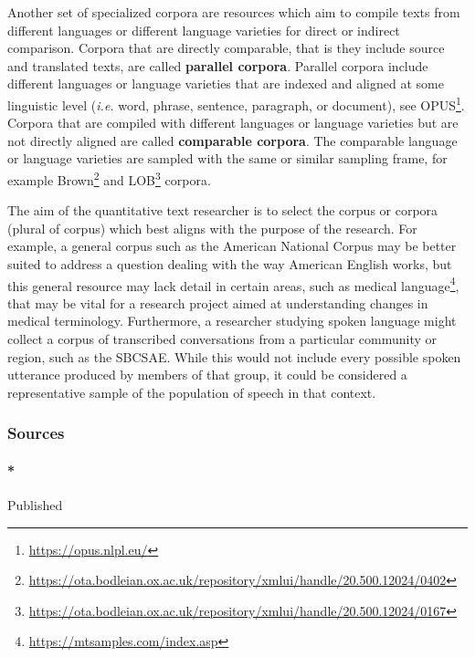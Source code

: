 \documentclass[
  letterpaper,
]{latex/krantz}
\let\oldparagraph\paragraph
\renewcommand{\paragraph}[1]{\oldparagraph{#1}\mbox{}}
\DeclareRobustCommand{\href}[2]{#2\footnote{\url{#1}}}
\begin{document}
Another set of specialized corpora are resources which aim to compile
texts from different languages or different language varieties for
direct or indirect comparison. Corpora that are directly comparable,
that is they include source and translated texts, are called
\textbf{parallel corpora}. Parallel corpora include different languages
or language varieties that are indexed and aligned at some linguistic
level (\emph{i.e.} word, phrase, sentence, paragraph, or document), see
\href{https://opus.nlpl.eu/}{OPUS}. Corpora that are compiled with
different languages or language varieties but are not directly aligned
are called \textbf{comparable corpora}. The comparable language or
language varieties are sampled with the same or similar sampling frame,
for example
\href{https://ota.bodleian.ox.ac.uk/repository/xmlui/handle/20.500.12024/0402}{Brown}
and
\href{https://ota.bodleian.ox.ac.uk/repository/xmlui/handle/20.500.12024/0167}{LOB}
corpora.

The aim of the quantitative text researcher is to select the corpus or
corpora (plural of corpus) which best aligns with the purpose of the
research. For example, a general corpus such as the American National
Corpus may be better suited to address a question dealing with the way
American English works, but this general resource may lack detail in
certain areas, such as \href{https://mtsamples.com/index.asp}{medical
language}, that may be vital for a research project aimed at
understanding changes in medical terminology. Furthermore, a researcher
studying spoken language might collect a corpus of transcribed
conversations from a particular community or region, such as the SBCSAE.
While this would not include every possible spoken utterance produced by
members of that group, it could be considered a representative sample of
the population of speech in that context.

\hypertarget{sources}{%
\subsubsection{Sources}\label{sources}}

\hypertarget{published}{%
\paragraph*{Published}\label{published}}
\end{document}

